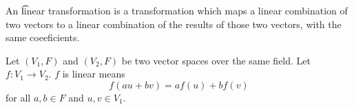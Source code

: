 

An \t{linear transformation} is a transformation which maps  a linear combination of two vectors to a linear combination of the results of those two vectors, with the same coeeficients.


Let $(V_1, F)$
and $(V_2, F)$ be two
vector spaces over the
same field.
Let $f: V_1 \to V_2$.
$f$ is linear means
\[
  f(au + bv) = af(u) + bf(v)
\]
for all $a, b \in F$ and $u, v \in V_1$.
